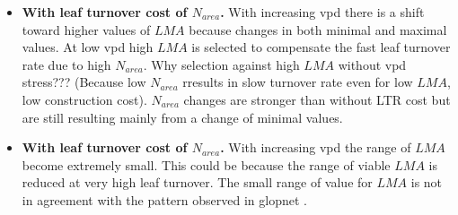 \documentclass[a4paper,11pt]{article}
\begin{document}
\begin{itemize}
\item \textbf{With leaf turnover cost of $N_{area}$.} With increasing
  vpd there is a shift toward higher values of $LMA$ because changes
  in both minimal and maximal values. At low vpd high $LMA$ is
  selected to compensate the fast leaf turnover rate due to high
  $N_{area}$. Why selection against high $LMA$ without vpd stress???
  (Because low $N_{area}$ rresults in slow turnover rate even for low
  $LMA$, low construction cost). $N_{area}$ changes are stronger
  than without LTR cost but are still resulting mainly from a change
  of minimal values. 

\item \textbf{With leaf turnover cost of $N_{area}$.} With increasing
  vpd the range of $LMA$ become extremely small. This could be because
  the range of viable $LMA$ is reduced at very high leaf turnover. The small range of
  value for $LMA$ is not in agreement with the pattern observed in
  glopnet \citep{Wright-2004}. 

\end{itemize}


\clearpage



\end{document}
